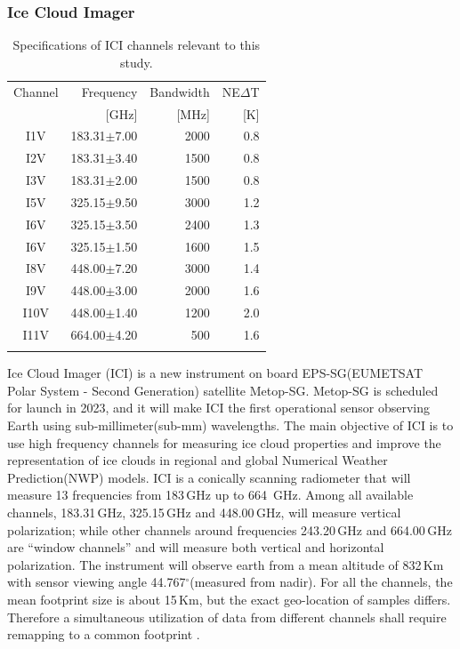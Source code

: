 \documentclass[amt, manuscript]{copernicus}
\begin{document}
\subsubsection{Ice Cloud Imager}
%
\begin{table}[t]	
	\caption{Specifications of ICI channels relevant to this study.}
	\label{tab:ICI_MWI_channels}
	\begin{tabular}{crrr}
		\tophline
		Channel & Frequency 	& Bandwidth  	&NE$\Delta$T	\\
				& [GHz]			& [MHz]			& [K]			\\
		\middlehline
		I1V&	183.31$\pm$7.00    & 2000 			& 0.8 		\\
		I2V&	183.31$\pm$3.40    & 1500 			& 0.8 		\\
		I3V&	183.31$\pm$2.00    & 1500			& 0.8 		\\
		I5V&	325.15$\pm$9.50    & 3000			& 1.2 		\\
		I6V&	325.15$\pm$3.50    & 2400			& 1.3 		\\
		I6V&	325.15$\pm$1.50    & 1600			& 1.5 		\\
		I8V&	448.00$\pm$7.20    & 3000			& 1.4 		\\
		I9V&	448.00$\pm$3.00    & 2000			& 1.6 		\\
		I10V&	448.00$\pm$1.40    & 1200			& 2.0 		\\
		I11V&	664.00$\pm$4.20    & \phantom{0}500	& 1.6 		\\		
		\bottomhline
	\end{tabular}
	\belowtable{} %
\end{table}

Ice Cloud Imager (ICI) is a new instrument on board EPS-SG(EUMETSAT Polar System - Second Generation) satellite Metop-SG. Metop-SG is scheduled for launch in 2023, and it will make ICI the first operational sensor observing Earth using sub-millimeter(sub-mm) wavelengths. The main objective of ICI is to use high frequency channels for measuring ice cloud properties and improve the representation of ice clouds in regional and global Numerical Weather Prediction(NWP) models. ICI is a conically scanning radiometer that will measure 13 frequencies from 183\,GHz up to 664\, GHz.  Among all available channels, 183.31\,GHz, 325.15\,GHz and 448.00\,GHz, will measure vertical polarization;  while other channels around frequencies 243.20\,GHz and 664.00\,GHz are ``window channels'' and will measure both vertical and horizontal polarization. The instrument will observe earth from a mean altitude of 832\,Km with sensor viewing angle 44.767$^\circ$(measured from nadir). For all the channels, the mean footprint size is about 15\,Km, but the exact geo-location of samples differs. Therefore a simultaneous utilization of data from different channels shall require remapping to a common footprint \citep{eriksson:towar:20}.
\end{document}
